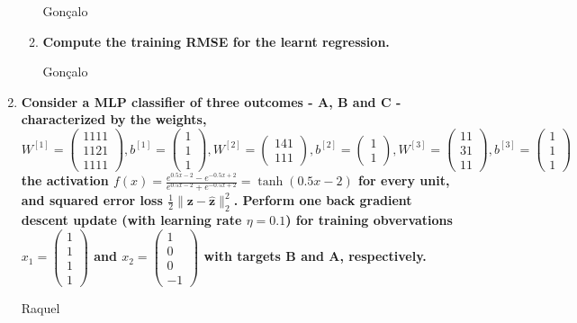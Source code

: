 \documentclass[12pt]{article}
\begin{document}
\begin{enumerate}[leftmargin=\labelsep]
\begin{enumerate}
              \vskip 0.3cm

              Gonçalo

        \item \textbf{Compute the training RMSE for the learnt regression.}
        
              \vskip 0.3cm

              Gonçalo

      \end{enumerate}
           
      \item \textbf{Consider a MLP classifier of three outcomes - A, B and C - characterized by the weights, \\
      $W^{[1]} = \begin{pmatrix} 1 1 1 1 \\ 1 1 2 1 \\ 1 1 1 1\end{pmatrix}, b^{[1]} = \begin{pmatrix} 1 \\ 1 \\ 1 \end{pmatrix}, 
      W^{[2]} = \begin{pmatrix} 1 4 1 \\ 1 1 1 \end{pmatrix}, b^{[2]} = \begin{pmatrix} 1 \\ 1 \end{pmatrix},
      W^{[3]} = \begin{pmatrix} 1 1 \\ 3 1 \\ 1 1\end{pmatrix}, b^{[3]} = \begin{pmatrix} 1 \\ 1 \\ 1 \end{pmatrix}$ \\
      the activation $f(x) = \frac{{e^{0.5x - 2} - e^{-0.5x + 2}}}{{e^{0.5x - 2} + e^{-0.5x + 2}}} = \tanh(0.5x - 2)$ for every unit, and squared error
      loss $\frac{1}{2} \|\mathbf{z} - \hat{\mathbf{z}}\|^{2}_{2}$. Perform one back gradient descent update (with learning rate $\eta = 0.1$) for training
      obvervations $x_1 = \begin{pmatrix} 1 \\ 1 \\ 1 \\ 1 \end{pmatrix}$ and $x_2 = \begin{pmatrix} 1 \\ 0 \\ 0 \\ -1 \end{pmatrix}$ with targets B and A, 
      respectively.}

      \vskip 0.3cm

      Raquel
           
  \end{enumerate}
\end{document}
